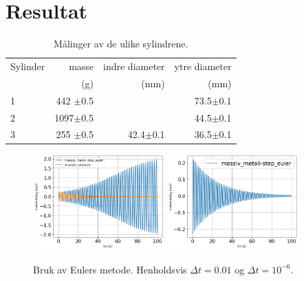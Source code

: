 \section{Resultat}

\begin{table}[h!]
	\begin{center}
		\caption{Målinger av de ulike sylindrene.}
		\label{MinLilleTabell}	%
		\begin{tabular}{lrrr} 		%
			\hline 								%
		    Sylinder &  masse  & indre diameter & ytre diameter \\ %
			&  (g)    &   (mm)   &  (mm)    \\ %
			\hline												
			1   &  442 \(\pm\)0.5 & 	  & 73.5\(\pm\)0.1 \\ %
			2   &  1097\(\pm\)0.5 & 	  & 44.5\(\pm\)0.1 \\ %
			3   &  255 \(\pm\)0.5 & 42.4\(\pm\)0.1 & 36.5\(\pm\)0.1 \\ %
			\hline
		\end{tabular}
	\end{center}
\end{table}


\begin{figure}[p] 
	\begin{center}
        	\includegraphics[width=0.45\textwidth]{img/massiv_metall-step_euler.png}
        	\includegraphics[width=0.45\textwidth]{img/massiv_metall-step_euler-plot.png}
        \end{center}
	\caption{Bruk av Eulers metode. Henholdsvis \(\Delta t = 0.01\) og \(\Delta t = 10^{-6}\).}
	\label{Fig step-Euler} %
\end{figure}

